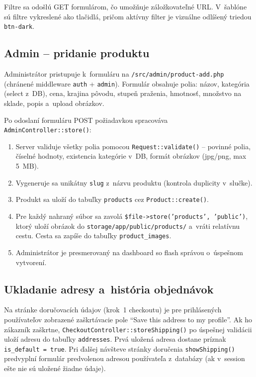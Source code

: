 \documentclass[12pt, a4paper]{article}
\begin{document}
Filtre sa odošlú GET formulárom, čo umožňuje záložkovateľné URL. V~šablóne sú filtre vykreslené ako tlačidlá, pričom aktívny filter je vizuálne odlíšený triedou \texttt{btn-dark}.

\subsection{Admin -- pridanie produktu}

Administrátor pristupuje k~formuláru na \texttt{/src/admin/product-add.php} (chránené middleware \texttt{auth} + \texttt{admin}). Formulár obsahuje polia: názov, kategória (select z~DB), cena, krajina pôvodu, stupeň praženia, hmotnosť, množstvo na sklade, popis a~upload obrázkov.

Po odoslaní formuláru POST požiadavkou spracováva \texttt{AdminController::store()}:

\begin{enumerate}
  \item Server validuje všetky polia pomocou \texttt{Request::validate()} -- povinné polia, číselné hodnoty, existencia kategórie v~DB, formát obrázkov (jpg/png, max 5~MB).
  \item Vygeneruje sa unikátny \texttt{slug} z~názvu produktu (kontrola duplicity v~slučke).
  \item Produkt sa uloží do tabuľky \texttt{products} cez \texttt{Product::create()}.
  \item Pre každý nahraný súbor sa zavolá \texttt{\$file->store('products', 'public')}, ktorý uloží obrázok do \texttt{storage/app/public/products/} a~vráti relatívnu cestu. Cesta sa zapíše do tabuľky \texttt{product\_images}.
  \item Administrátor je presmerovaný na dashboard so flash správou o~úspešnom vytvorení.
\end{enumerate}

\subsection{Ukladanie adresy a~história objednávok}

Na stránke doručovacích údajov (krok~1 checkoutu) je pre prihlásených používateľov zobrazené zaškrtávacie pole ``Save this address to my profile''. Ak ho zákazník zaškrtne, \texttt{CheckoutController::storeShipping()} po úspešnej validácii uloží adresu do tabuľky \texttt{addresses}. Prvá uložená adresa dostane príznak \texttt{is\_default = true}. Pri ďalšej návšteve stránky doručenia \texttt{showShipping()} predvyplní formulár predvolenou adresou používateľa z~databázy (ak v~session ešte nie sú uložené žiadne údaje).
\end{document}
